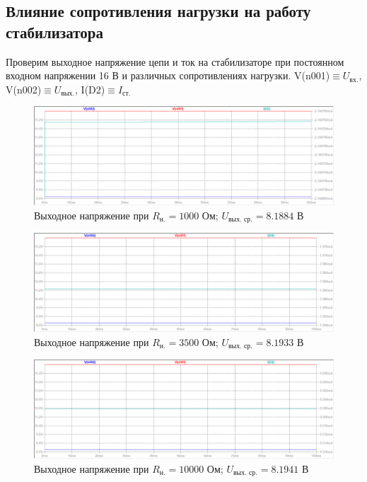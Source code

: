 \documentclass[a4paper, 12pt]{article}
\begin{document}
    \subsection{Влияние сопротивления нагрузки на работу стабилизатора}
    Проверим выходное напряжение цепи и ток на стабилизаторе при постоянном входном напряжении
    16 В и различных сопротивлениях нагрузки. V(n001)$\equiv U_{\text{вх.}}$, V(n002)$\equiv U_{\text{вых.}}$,
    I(D2)$\equiv I_{\text{ст.}}$
    \begin{figure}[H]
        \centering
        \includegraphics[scale=0.46]{1task_R1k.png}
        \captionsetup{skip=0pt}
        \caption{Выходное напряжение при $R_{\text{н.}}=1000$ Ом; $U_{\text{вых. ср.}}=8.1884$ В}
        \label{fig:1task_R1k}
    \end{figure}
    \begin{figure}[H]
        \centering
        \includegraphics[scale=0.46]{1task_R3_5k.png}
        \captionsetup{skip=0pt}
        \caption{Выходное напряжение при $R_{\text{н.}}=3500$ Ом; $U_{\text{вых. ср.}}=8.1933$ В}
        \label{fig:1task_R3_5k}
    \end{figure}
    \begin{figure}[H]
        \centering
        \includegraphics[scale=0.46]{1task_R10k.png}
        \captionsetup{skip=0pt}
        \caption{Выходное напряжение при $R_{\text{н.}}=10000$ Ом; $U_{\text{вых. ср.}}=8.1941$ В}
        \label{fig:1task_R10k}
    \end{figure}
\end{document}
